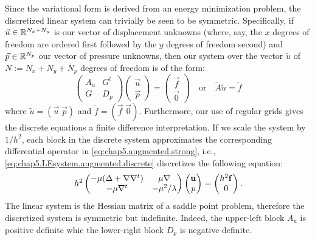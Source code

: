 Since the variational form is derived from an energy minimization problem, the discretized linear system can trivially be seen to be symmetric. Specifically, if $\vec{u} \in \mathbb{R}^{N_x + N_y}$ is our vector of displacement unknowns (where, say, the $x$ degrees of freedom are ordered first followed by the $y$ degrees of freedom second) and $\vec{p} \in \mathbb{R}^{N_p}$ our vector of pressure unknowns, then our system over the vector $\tilde{u}$ of $N := N_x + N_y + N_p$ degrees of freedom is of the form:
\begin{equation} \label{eq:chap5.LEsystem.augmented.discrete}
\begin{pmatrix} A_u & G^t \\ G & D_p \end{pmatrix}
\begin{pmatrix} \vec{u} \\ \vec{p} \end{pmatrix}
= \begin{pmatrix} \vec{f} \\ \vec{0} \end{pmatrix}
\quad \text{or} \quad \tilde{A} \tilde{u} = \tilde{f}
\end{equation}
where $\tilde{u} = (\vec{u} \; \vec{p})$ and $\tilde{f} = (\vec{f} \; \vec{0})$. Furthermore, our use of regular grids gives the discrete equations a finite difference interpretation. If we scale the system by $1/h^2$, each block in the discrete system approximates the corresponding differential operator in \eqref{eq:chap5.augmented.strong}, i.e., \eqref{eq:chap5.LEsystem.augmented.discrete} discretizes the following equation:
\begin{equation} \label{eq:chap5.LEsystem.augmented.continuous}
h^2 \begin{pmatrix} -\mu (\Delta + \nabla \nabla^t) & \mu \nabla \\ -\mu \nabla^t & -\mu^2/\lambda \end{pmatrix}
\begin{pmatrix} \mathbf{u} \\ p \end{pmatrix}
= \begin{pmatrix} h^2 \mathbf{f} \\ 0 \end{pmatrix}.
\end{equation}
The linear system is the Hessian matrix of a saddle point problem, therefore the discretized system is symmetric but indefinite. Indeed, the upper-left block $A_u$ is positive definite whie the lower-right block $D_p$ is negative definite.


